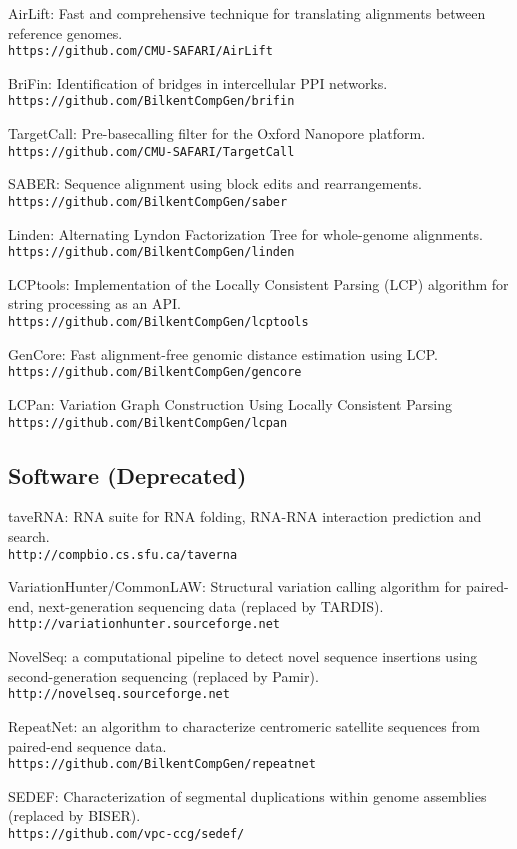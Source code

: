 \begin{list2}
  \item
AirLift: Fast and comprehensive technique for translating alignments between reference genomes.\\
{\tt https://github.com/CMU-SAFARI/AirLift}
\item 
BriFin: Identification of bridges in intercellular PPI networks.\\
{\tt https://github.com/BilkentCompGen/brifin}
\item 
TargetCall: Pre-basecalling filter for the Oxford Nanopore platform.\\
{\tt https://github.com/CMU-SAFARI/TargetCall}
\item 
SABER: Sequence alignment using block edits and rearrangements.\\
{\tt https://github.com/BilkentCompGen/saber}
\item 
Linden: Alternating Lyndon Factorization Tree for whole-genome alignments.\\
{\tt https://github.com/BilkentCompGen/linden}
\item
LCPtools: Implementation of the Locally Consistent Parsing (LCP) algorithm for string processing as an API. \\
{\tt https://github.com/BilkentCompGen/lcptools}
\item
GenCore: Fast alignment-free genomic distance estimation using LCP.\\
{\tt https://github.com/BilkentCompGen/gencore}
\item 
LCPan: Variation Graph Construction Using Locally Consistent Parsing\\
{\tt https://github.com/BilkentCompGen/lcpan}
\end{list2}

\clearpage

\subsection{\small \sc Software (Deprecated)}
\begin{list2}
\item
  taveRNA: RNA suite for RNA folding, RNA-RNA interaction prediction and search. \\
  {\tt http://compbio.cs.sfu.ca/taverna}
\item
  VariationHunter/CommonLAW: Structural variation calling algorithm for paired-end, next-generation sequencing data (replaced by TARDIS).
  {\tt http://variationhunter.sourceforge.net}
\item
  NovelSeq: a computational pipeline to detect novel sequence insertions using second-generation sequencing (replaced by Pamir).
  {\tt http://novelseq.sourceforge.net}
\item
  RepeatNet: an algorithm to characterize centromeric satellite sequences from paired-end sequence data.\\
  {\tt https://github.com/BilkentCompGen/repeatnet}
  \item
  SEDEF: Characterization of segmental duplications within genome assemblies (replaced by BISER).\\
  {\tt https://github.com/vpc-ccg/sedef/}
\end{list2}



